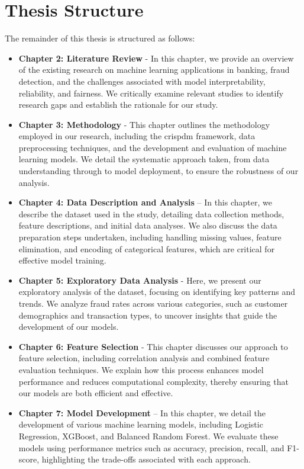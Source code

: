 \documentclass[12pt,a4paper]{report}
\begin{document}
\section{Thesis Structure}
The remainder of this thesis is structured as follows:

\begin{itemize}
    \item \textbf{Chapter 2: Literature Review} - In this chapter, we provide an overview of the existing research on machine learning applications in banking, fraud detection, and the challenges associated with model interpretability, reliability, and fairness. We critically examine relevant studies to identify research gaps and establish the rationale for our study.

    \item \textbf{Chapter 3: Methodology} - This chapter outlines the methodology employed in our research, including the \acrshort{crispdm} framework, data preprocessing techniques, and the development and evaluation of machine learning models. We detail the systematic approach taken, from data understanding through to model deployment, to ensure the robustness of our analysis.

    \item \textbf{Chapter 4: Data Description and Analysis} – In this chapter, we describe the dataset used in the study, detailing data collection methods, feature descriptions, and initial data analyses. We also discuss the data preparation steps undertaken, including handling missing values, feature elimination, and encoding of categorical features, which are critical for effective model training.

    \item \textbf{Chapter 5: Exploratory Data Analysis} - Here, we present our exploratory analysis of the dataset, focusing on identifying key patterns and trends. We analyze fraud rates across various categories, such as customer demographics and transaction types, to uncover insights that guide the development of our models.

    \item \textbf{Chapter 6: Feature Selection} - This chapter discusses our approach to feature selection, including correlation analysis and combined feature evaluation techniques. We explain how this process enhances model performance and reduces computational complexity, thereby ensuring that our models are both efficient and effective.

    \item \textbf{Chapter 7: Model Development} – In this chapter, we detail the development of various machine learning models, including Logistic Regression, XGBoost, and Balanced Random Forest. We evaluate these models using performance metrics such as accuracy, precision, recall, and F1-score, highlighting the trade-offs associated with each approach.


\end{itemize}
\end{document}
